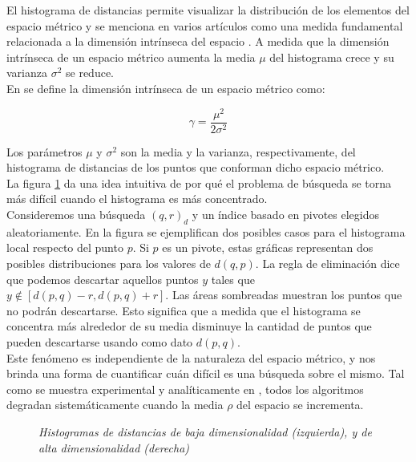 El histograma de distancias permite visualizar la distribuci\'on de los elementos del espacio m\'etrico y se menciona en varios art\'iculos como una medida fundamental relacionada a la dimensi\'on intr\'inseca del espacio \cite{Bri95, CM97, cn00,alenex,CPZ98a}. A medida que la dimensi\'on intr\'inseca de un espacio m\'etrico aumenta la media  $\mu$ del histograma crece y su varianza $\sigma^{2}$ se reduce.\\

\noindent En \cite{oursurvey} se define la dimensi\'on intr\'inseca de un espacio m\'etrico como:

\[
\gamma = \frac{\mu^2}{2\sigma^2}
\]

Los par\'ametros $\mu$ y $\sigma^2$ son la media y la varianza, respectivamente, del histograma de distancias de los puntos que conforman dicho espacio m\'etrico.\\

La figura \ref{dim1} da una idea intuitiva de por qu\'e el problema de b\'usqueda se torna m\'as dif\'icil cuando el histograma es m\'as concentrado.\\

Consideremos una b\'usqueda $(q,r)_{d}$ y un \'indice basado en pivotes elegidos aleatoriamente. En la figura se ejemplifican dos posibles casos para el histograma local respecto del punto $p$. Si $p$ es un pivote, estas gr\'aficas representan dos posibles distribuciones para los valores de $d(q,p)$. La regla de eliminaci\'on dice que podemos descartar aquellos puntos $y$ tales que  $y \notin [d(p,q)-r, d(p,q) + r]$. Las \'areas sombreadas muestran  los puntos que no podr\'an descartarse. Esto significa que a medida que el histograma se concentra m\'as alrededor de su media disminuye la cantidad de puntos que pueden descartarse usando como dato $d(p,q)$.\\

Este fen\'omeno es independiente de la naturaleza del espacio m\'etrico,  y nos brinda una forma de cuantificar cu\'an dif\'icil es una b\'usqueda sobre el mismo. Tal como se muestra experimental y anal\'iticamente en \cite{oursurvey}, todos los algoritmos degradan  sistem\'aticamente cuando la media $\rho$ del espacio se incrementa.\\

\begin{figure}[tb]
\centerline{%
  }
  \caption [Histogramas de distancias de baja y
             alta dimensionalidad]
    { \textsl{\footnotesize Histogramas de distancias de baja dimensionalidad
                (izquierda), y  de alta dimensionalidad (derecha)}}
\label{dim1}
\end{figure}